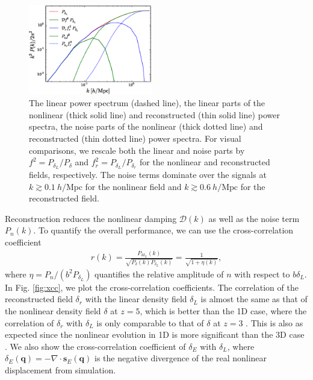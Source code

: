 \documentclass[aps,prl,twocolumn,showpacs,superscriptaddress,groupedaddress,nofootinbib]{revtex4}  %
\newcommand{\mr}{\mathrm}
\newcommand{\mc}{\mathcal}
\newcommand{\bea}{\begin{eqnarray}}
\newcommand{\eea}{\end{eqnarray}}
\begin{document}
\begin{figure}[tbp]
\begin{center}
\includegraphics[width=0.48\textwidth]{f2.eps}
\end{center}
\vspace{-0.7cm}
\caption{The linear power spectrum (dashed line), the linear parts of the
nonlinear (thick solid line) and reconstructed (thin solid line) power spectra,
the noise parts of the nonlinear (thick dotted line) and reconstructed
(thin dotted line) power spectra.
For visual comparisons, we rescale both the linear and noise parts by
$f^2=P_{\delta_L}/P_{\delta}$ and $f^2_r=P_{\delta_L}/P_{\delta_r}$ for the nonlinear and reconstructed fields, respectively.
The noise terms dominate over the signals at
$k\gtrsim0.1\ h/\mr{Mpc}$ for the nonlinear field and $k\gtrsim0.6\ h/\mr{Mpc}$
for the reconstructed field.}
\label{fig:ps}
\end{figure}

Reconstruction reduces the nonlinear damping $\mc{D}(k)$ as well as the
noise term $P_{n}(k)$. To quantify the overall performance, we can use the
cross-correlation coefficient
\bea
r(k)=\frac{P_{\delta\delta_L}(k)}
{\sqrt{P_{\delta}(k)P_{\delta_L}(k)}}
=\frac{1}{\sqrt{1+\eta(k)}},
\eea
where $\eta=P_n/(b^2P_{\delta_L})$ quantifies the relative amplitude
of $n$ with respect to $b\delta_L$. 
In Fig. \ref{fig:xcc}, we plot the cross-correlation coefficients.
The correlation of the reconstructed field $\delta_r$ with the linear density
field $\delta_L$ is almost the same as that of the nonlinear density field 
$\delta$ at $z=5$, which is better than the 1D case, where the correlation of
$\delta_r$ with $\delta_L$ is only comparable to that of $\delta$ 
at $z=3$ \cite{2016arXiv160907041Z}.
This is also as expected since the nonlinear evolution in 1D is more
significant than the 3D case \cite{2016matt}.
We also show the cross-correlation coefficient of $\delta_E$ with $\delta_L$,
where $\delta_E(\bm{q})=-\nabla\cdot \bm{s}_E(\bm{q})$ is the negative 
divergence of the real nonlinear displacement from simulation.
\end{document}
